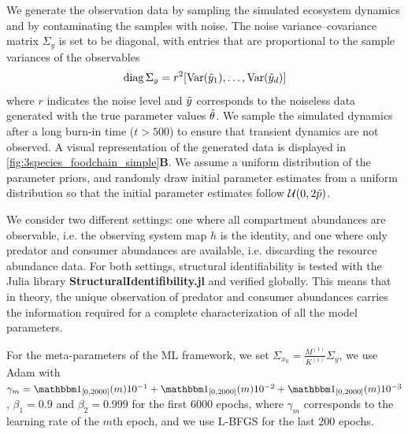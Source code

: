 We generate the observation data by sampling the simulated ecosystem dynamics and by contaminating the samples with noise. The noise variance--covariance matrix $\Sigma_y$ is set to be diagonal, with entries that are proportional to the sample variances of the observables
\begin{equation}
    \operatorname{diag} \Sigma_y = r^2 [{\operatorname{Var}}(\Tilde{y}_1), \dots, {\operatorname{Var}}(\Tilde{y}_d)]
\end{equation}
where $r$ indicates the noise level and $\Tilde{y}$ corresponds to the noiseless data generated with the true parameter values $\Tilde{\theta}$. 
%
We sample the simulated dynamics after a long burn-in time ($t > 500$) to ensure that transient dynamics are not observed.
%
A visual representation of the generated data is displayed in \cref{fig:3species_foodchain_simple}\textbf{B}.
%
We assume a uniform distribution of the parameter priors, and randomly draw initial parameter estimates from a uniform distribution so that the initial parameter estimates follow $\mathcal{U}(0, 2 \Tilde p)$.

We consider two different settings: one where all compartment abundances are observable, i.e. the observing system map $h$ is the identity, and one where only predator and consumer abundances are available, i.e. discarding the resource abundance data.
%
For both settings, structural identifiability is tested with the Julia library \textbf{StructuralIdentifibility.jl} \citep{Dong2021} and verified globally. This means that in theory, the unique observation of predator and consumer abundances carries the information required for a complete characterization of all the model parameters.

For the meta-parameters of the ML framework, we set 
% 
$\Sigma_{x_0} = \frac{M^{(1)}}{K^{(1)}} \Sigma_y$, 
% 
we use Adam with 
% 
$\gamma_m = \one_{[0,2000]}(m) 10^{-1} +\one_{[0,2000]}(m) 10^{-2} + \one_{[0,2000]}(m) 10^{-3} $, $\beta_1 = 0.9$ 
% 
and $\beta_2 = 0.999$ for the first 6000 epochs, where $\gamma_m$ corresponds to the learning rate of the $m$th epoch, and we use L-BFGS for the last 200 epochs.

